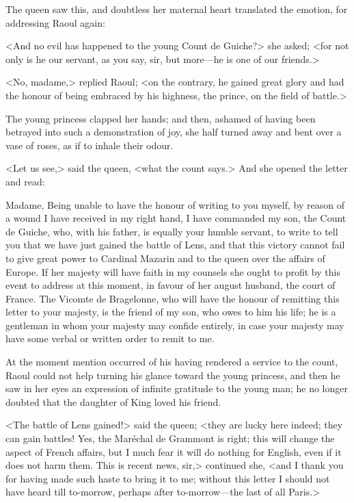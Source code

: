 The queen saw this, and doubtless her maternal heart translated the emotion, for addressing Raoul again:

<And no evil has happened to the young Count de Guiche?> she asked; <for not only is he our servant, as you say, sir, but more—he is one of our friends.>

<No, madame,> replied Raoul; <on the contrary, he gained great glory and had the honour of being embraced by his highness, the prince, on the field of battle.>

The young princess clapped her hands; and then, ashamed of having been betrayed into such a demonstration of joy, she half turned away and bent over a vase of roses, as if to inhale their odour.

<Let us see,> said the queen, <what the count says.> And she opened the letter and read: 

\goodbreak
\begin{a4}
	\vspace{-1.5em}
\end{a4}
\begin{mail}{}{Madame,}
Being unable to have the honour of writing to you myself, by reason of a wound I have received in my right hand, I have commanded my son, the Count de Guiche, who, with his father, is equally your humble servant, to write to tell you that we have just gained the battle of Lens, and that this victory cannot fail to give great power to Cardinal Mazarin and to the queen over the affairs of Europe. If her majesty will have faith in my counsels she ought to profit by this event to address at this moment, in favour of her august husband, the court of France. The Vicomte de Bragelonne, who will have the honour of remitting this letter to your majesty, is the friend of my son, who owes to him his life; he is a gentleman in whom your majesty may confide entirely, in case your majesty may have some verbal or written order to remit to me. 
\end{mail}

\goodbreak
At the moment mention occurred of his having rendered a service to the count, Raoul could not help turning his glance toward the young princess, and then he saw in her eyes an expression of infinite gratitude to the young man; he no longer doubted that the daughter of King  loved his friend.

<The battle of Lens gained!> said the queen; <they are lucky here indeed; they can gain battles! Yes, the Maréchal de Grammont is right; this will change the aspect of French affairs, but I much fear it will do nothing for English, even if it does not harm them. This is recent news, sir,> continued she, <and I thank you for having made such haste to bring it to me; without this letter I should not have heard till to-morrow, perhaps after to-morrow—the last of all Paris.>

